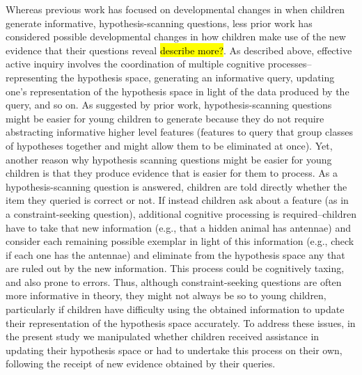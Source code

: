 \documentclass[man,floatsintext]{apa6}
\begin{document}
Whereas previous work has focused on developmental changes in when children generate informative, 
hypothesis-scanning questions, less prior work has considered possible developmental changes in how 
children make use of the new evidence that their questions reveal \hl{describe more?}. %
As described above, effective active inquiry involves the coordination of multiple cognitive processes--representing the hypothesis space, 
generating an informative query, updating one's representation of the hypothesis space in light of the 
data produced by the query, and so on. As suggested by prior work, hypothesis-scanning questions might 
be easier for young children to generate because they do not require abstracting informative higher level 
features (features to query that group classes of hypotheses together and might allow them to be eliminated 
at once). Yet, another reason why hypothesis scanning questions might be easier for young children is that they produce evidence that is easier for them to process. As a hypothesis-scanning question is answered, children are told directly whether the item they queried is correct or not. If instead children ask about a feature (as in a constraint-seeking question), additional cognitive processing is required--children have to take that new information (e.g., that a hidden animal has antennae) and consider each remaining possible 
exemplar in light of this information (e.g., check if each one has the antennae) and eliminate from the 
hypothesis space any that are ruled out by the new information. This process could be cognitively taxing, 
and also prone to errors. Thus, although constraint-seeking questions are often more informative in 
theory, they might not always be so to young children, particularly if children have difficulty using the 
obtained information to update their representation of the hypothesis space accurately. To address 
these issues, in the present study we manipulated whether children received assistance in updating 
their hypothesis space or had to undertake this process on their own, following the receipt of new 
evidence obtained by their queries. 
\end{document}
